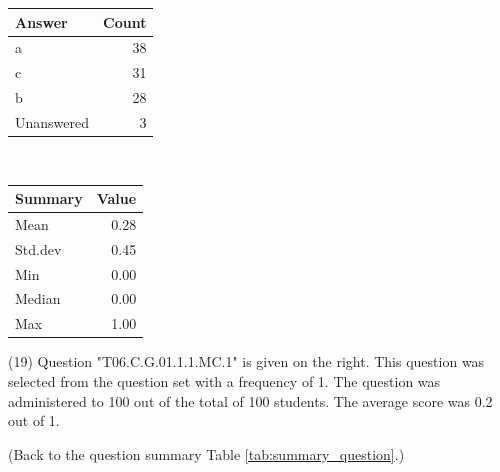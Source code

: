 \documentclass[12pt,nohyper]{tufte-handout}\usepackage[]{graphicx}\usepackage[]{color}
\begin{document}
\begin{center}%
\begin{tabular}{lr}
  \hline
Answer & Count \\ 
  \hline
a &  38 \\ 
  c &  31 \\ 
  b &  28 \\ 
  Unanswered &   3 \\ 
   \hline
\end{tabular}
~~~~~~~~%
\begin{tabular}{lr}
  \hline
Summary & Value \\ 
  \hline
Mean & 0.28 \\ 
  Std.dev & 0.45 \\ 
  Min & 0.00 \\ 
  Median & 0.00 \\ 
  Max & 1.00 \\ 
   \hline
\end{tabular}
\end{center}\newpage{} (19) Question "T06.C.G.01.1.1.MC.1" is given on the right. This question was selected from the question set with a frequency of 1. The question was administered to 100 out of the total of 100 students. The average score was 0.2 out of 1.

 (Back to the question summary Table \ref{tab:summary_question}.)
\end{document}
